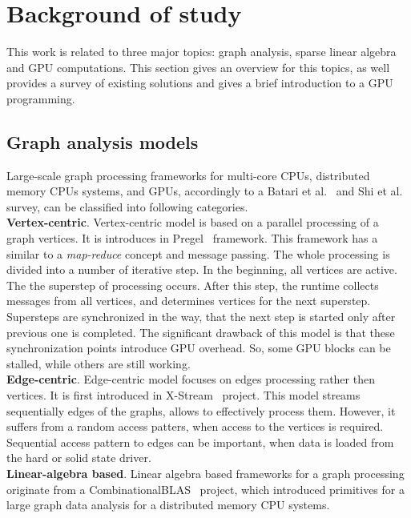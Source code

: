 \section{Background of study}

This work is related to three major topics: graph analysis, sparse linear algebra and GPU computations. This section gives an overview for this topics, as well provides a survey of existing solutions and gives a brief introduction to a GPU programming.

\subsection{Graph analysis models}

Large-scale graph processing frameworks for multi-core CPUs, distributed memory CPUs systems, and GPUs, accordingly to a Batari et al.~\cite{article:batarfi_survey_graphs} and Shi et al.~\cite{article:shi_survey_graphs} survey, can be classified into following categories.\\

\textbf{Vertex-centric}. Vertex-centric model is based on a parallel processing of a graph vertices. It is introduces in Pregel~\cite{article:pregel} framework. This framework has a similar to a \textit{map-reduce} concept and message passing. The whole processing is divided into a number of iterative step. In the beginning, all vertices are active. The the superstep of processing occurs. After this step, the runtime collects messages from all vertices, and determines vertices for the next superstep. Supersteps are synchronized in the way, that the next step is started only after previous one is completed. The significant drawback of this model is that these synchronization points introduce GPU overhead. So, some GPU blocks can be stalled, while others are still working.\\   

\textbf{Edge-centric}. Edge-centric model focuses on edges processing rather then vertices. It is first introduced in X-Stream~\cite{article:xstream} project. This model streams sequentially edges of the graphs, allows to effectively process them. However, it suffers from a random access patters, when access to the vertices is required. Sequential access pattern to edges can be important, when data is loaded from the hard or solid state driver.\\

\textbf{Linear-algebra based}. Linear algebra based frameworks for a graph processing originate from a CombinationalBLAS~\cite{article:combblas} project, which introduced primitives for a large graph data analysis for a distributed memory CPU systems. 

